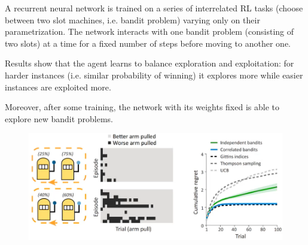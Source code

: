 \begin{casestudy}
    A recurrent neural network is trained on a series of interrelated RL tasks (choose between two slot machines, i.e. bandit problem) varying only on their parametrization. The network interacts with one bandit problem (consisting of two slots) at a time for a fixed number of steps before moving to another one.

    Results show that the agent learns to balance exploration and exploitation: for harder instances (i.e. similar probability of winning) it explores more while easier instances are exploited more.

    Moreover, after some training, the network with its weights fixed is able to explore new bandit problems.

    \begin{figure}[H]
        \centering
        \includegraphics[width=0.6\linewidth]{./img/rnn_meta1.png}
    \end{figure}
\end{casestudy}

